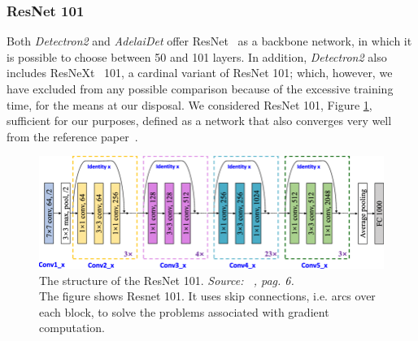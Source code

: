 \documentclass[10pt,twocolumn,letterpaper]{article}
\begin{document}
\subsubsection{ResNet 101}
Both \textit{Detectron2} and \textit{AdelaiDet} offer ResNet~\cite{Authors5_ResNet} as a backbone network, in which it is possible to choose between 50 and 101 layers.  In addition, \textit{Detectron2} also includes ResNeXt~\cite{resxt} 101, a cardinal variant of ResNet 101; which, however, we have excluded from any possible comparison because of the excessive training time, for the means at our disposal.
We considered ResNet 101, Figure \ref{fig:resnet101}, sufficient for our purposes, defined as a network that also converges very well from the reference paper~\cite{Authors5_ResNet}.
\begin{figure}[H]
\centering
  \includegraphics[width=0.95\linewidth]{./image/resnet101.png} 
  \caption{The structure of the ResNet 101. \textit{Source: ~\cite{resnet101_img}, pag. 6.}\\
  The figure shows Resnet 101. It uses skip connections, i.e. arcs over each block, to solve the problems associated with gradient computation.}%
  \label{fig:resnet101}
\noindent
\end{figure}
\end{document}
